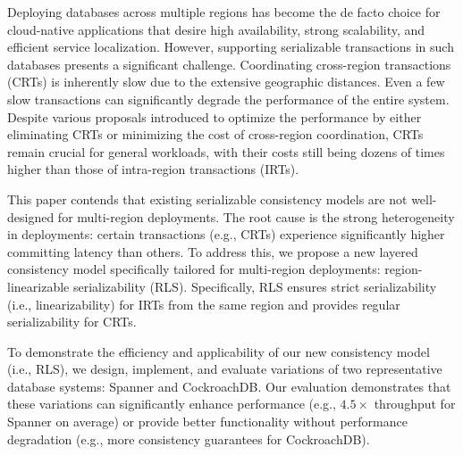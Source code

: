 Deploying databases across multiple regions has become the de facto choice for cloud-native applications that desire high availability, strong scalability, and efficient service localization. However, supporting serializable transactions in such databases presents a significant challenge. Coordinating cross-region transactions (CRTs) is inherently slow due to the extensive geographic distances. Even a few slow transactions can significantly degrade the performance of the entire system. 
Despite various proposals introduced to optimize the performance by either eliminating CRTs or minimizing the cost of cross-region coordination, CRTs remain crucial for general workloads, with their costs still being dozens of times higher than those of intra-region transactions (IRTs).

This paper contends that existing serializable consistency models are not well-designed for multi-region deployments. The root cause is the strong heterogeneity in deployments: certain transactions (e.g., CRTs) experience significantly higher committing latency than others.
To address this, we propose a new layered consistency model specifically tailored for multi-region deployments: region-linearizable serializability (RLS). Specifically, RLS ensures strict serializability (i.e., linearizability) for IRTs from the same region and provides regular serializability for CRTs.

To demonstrate the efficiency and applicability of our new consistency model (i.e., RLS), we design, implement, and evaluate variations of two representative database systems: Spanner and CockroachDB. Our evaluation demonstrates that these variations can significantly enhance performance (e.g., $4.5\times$ throughput for Spanner on average) or provide better functionality without performance degradation (e.g., more consistency guarantees for CockroachDB). 
